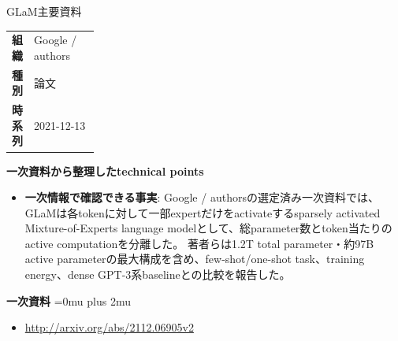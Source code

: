 \begin{technicalnote}{GLaM}{主要資料}
\begingroup
\begin{tabularx}{\linewidth}{@{}>{\bfseries}p{0.22\linewidth}X@{}}
組織 & Google / authors \\
種別 & 論文 \\
時系列 & 2021-12-13 \\
\end{tabularx}
\smallskip
{\bfseries 一次資料から整理したtechnical points}
\begin{itemize}[leftmargin=1.5em,itemsep=0.35em]
\item \textbf{一次情報で確認できる事実}: Google / authorsの選定済み一次資料では、GLaMは各tokenに対して一部expertだけをactivateするsparsely activated Mixture-of-Experts language modelとして、総parameter数とtoken当たりのactive computationを分離した。 著者らは1.2T total parameter・約97B active parameterの最大構成を含め、few-shot/one-shot task、training energy、dense GPT-3系baselineとの比較を報告した。
\end{itemize}
\begin{minipage}{\linewidth}
\begin{samepage}
{\bfseries 一次資料}
\begingroup\sloppy
\Urlmuskip=0mu plus 2mu\relax
\begin{itemize}[leftmargin=1.5em,itemsep=0.25em]
\item {\scriptsize\url{http://arxiv.org/abs/2112.06905v2}}
\end{itemize}
\endgroup
\end{samepage}
\end{minipage}
\endgroup
\end{technicalnote}
\medskip

